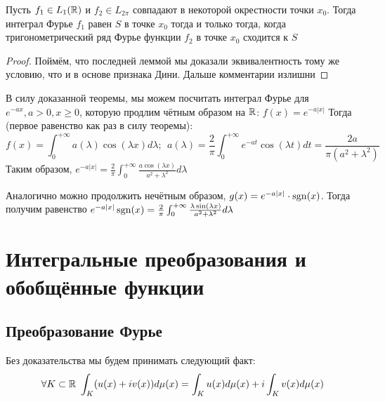 \begin{theorem}
	Пусть $f_1 \in L_1(\mathbb{R})$ и $f_2 \in L_{2\pi}$ совпадают в некоторой окрестности точки $x_0$. Тогда интеграл Фурье $f_1$ равен $S$ в точке $x_0$ тогда и только тогда, когда тригонометрический ряд Фурье функции $f_2$ в точке $x_0$ сходится к $S$
\end{theorem}

\begin{proof}
	Поймём, что последней леммой мы доказали эквивалентность тому же условию, что и в основе признака Дини. Дальше комментарии излишни
\end{proof}

\begin{example}
	В силу доказанной теоремы, мы можем посчитать интеграл Фурье для $e^{-ax}, a > 0, x \ge 0$, которую продлим чётным образом на $\mathbb{R}$: $f(x) = e^{-a|x|}$ Тогда (первое равенство как раз в силу теоремы):
	\[
		f(x) = \int_0^{+\infty} a(\lambda)\cos(\lambda x)d\lambda;\ \ a(\lambda) = \frac{2}{\pi} \int_0^{+\infty} e^{-at}\cos(\lambda t)dt = \frac{2a}{\pi(a^2 + \lambda^2)}
	\]
	Таким образом, $e^{-a|x|} = \frac{2}{\pi} \int_0^{+\infty} \frac{a\cos(\lambda x)}{a^2 + \lambda^2}d\lambda$
	
	Аналогично можно продолжить нечётным образом, $g(x) = e^{-a|x|} \cdot \operatorname{sgn}(x)$. Тогда получим равенство $e^{-a|x|} \operatorname{sgn}(x) = \frac{2}{\pi} \int_0^{+\infty} \frac{\lambda \sin(\lambda x)}{a^2 + \lambda^2}d\lambda$
\end{example}

\section{Интегральные преобразования и обобщённые функции}

\subsection{Преобразование Фурье}

\begin{note}
	Без доказательства мы будем принимать следующий факт:
	\[
		\forall K \subset \mathbb{R}\ \int_K (u(x) + iv(x))d\mu(x) = \int_K u(x)d\mu(x) + i\int_K v(x)d\mu(x)
	\]
\end{note}


